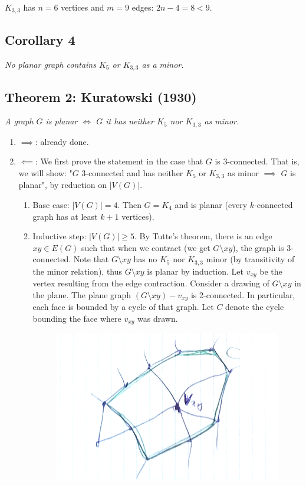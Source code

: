 		$K_{3,3}$ has $n = 6$ vertices and $m = 9$ edges: $2n - 4 = 8 < 9$.
		
		\subsection{Corollary 4}
		\textit{No planar graph contains $K_5$ or $K_{3,3}$ as a minor.}
		
		\subsection{Theorem 2: Kuratowski (1930)}
		\textit{A graph $G$ is planar $\iff$ $G$ it has neither $K_5$ nor $K_{3,3}$ as minor.\\}
		
		\begin{enumerate}
			\item $\implies$: already done.
			\item $\impliedby$: We first prove the statement in the case that $G$ is 3-connected. That is, we will show: "$G$ 3-connected and has neither $K_5$ or $K_{3,3}$ as minor $\implies$ $G$ is planar", by reduction on $|V(G)|$.
				\begin{enumerate}
					\item Base case: $|V(G)| = 4$. Then $G = K_4$ and is planar (every $k$-connected graph has at least $k+1$ vertices).
					\item Inductive step: $|V(G)| \geq 5$. By Tutte's theorem, there is an edge $xy \in E(G)$ such that when we contract (we get $G \setminus xy$), the graph is 3-connected. Note that $G \setminus xy$ has no $K_5$ nor $K_{3,3}$ minor (by transitivity of the minor relation), thus $G \setminus xy$ is planar by induction. Let $v_{xy}$ be the vertex resulting from the edge contraction. Consider a drawing of $G \setminus xy$ in the plane. The plane graph $(G \setminus xy) - v_{xy}$ is 2-connected. In particular, each face is bounded by a cycle of that graph. Let $C$ denote the cycle bounding the face where $v_{xy}$ was drawn.
\begin{figure}[h]
	\center
	\includegraphics[width=0.3\linewidth]{img/4-1.png}
\end{figure}


\end{enumerate}
\end{enumerate}
